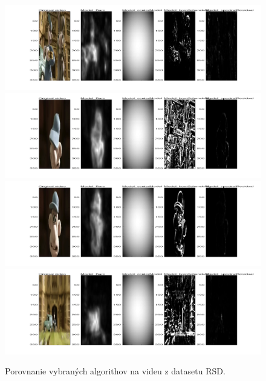 \begin{figure}[H]
 \includegraphics[width=17cm]{pics/porovnanie-1.png}
 \includegraphics[width=17cm]{pics/porovnanie-2.png}
 \includegraphics[width=17cm]{pics/porovnanie-3.png}
 \includegraphics[width=17cm]{pics/porovnanie-4.png}
 \caption{Porovnanie vybraných algorithov na videu z datasetu RSD.}
\end{figure}
